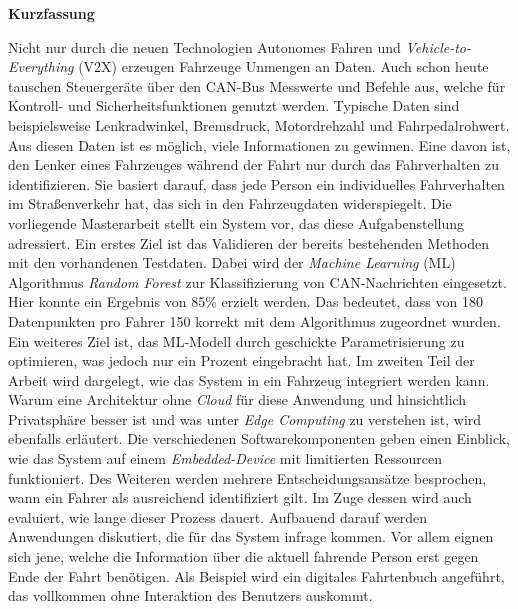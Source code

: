 %
%
%
%
%



\cleardoublepage

{\Large\bfseries Kurzfassung\\}

Nicht nur durch die neuen Technologien Autonomes Fahren und \textit{Vehicle-to-Everything} (V2X) erzeugen Fahrzeuge Unmengen an Daten. Auch schon heute tauschen Steuergeräte über den CAN-Bus Messwerte und Befehle aus, welche für Kontroll- und Sicherheitsfunktionen genutzt werden. Typische Daten sind beispielsweise Lenkradwinkel, Bremsdruck, Motordrehzahl und Fahrpedalrohwert. Aus diesen Daten ist es möglich, viele Informationen zu gewinnen. Eine davon ist, den Lenker eines Fahrzeuges während der Fahrt nur durch das Fahrverhalten zu identifizieren. Sie basiert darauf, dass jede Person ein individuelles Fahrverhalten im Straßenverkehr hat, das sich in den Fahrzeugdaten widerspiegelt. Die vorliegende Masterarbeit stellt ein System vor, das diese Aufgabenstellung adressiert. Ein erstes Ziel ist das Validieren der bereits bestehenden Methoden mit den vorhandenen Testdaten. Dabei wird der \textit{Machine Learning} (ML) Algorithmus \textit{Random Forest} zur Klassifizierung von CAN-Nachrichten eingesetzt. Hier konnte ein Ergebnis von 85\% erzielt werden. Das bedeutet, dass von 180 Datenpunkten pro Fahrer 150 korrekt mit dem Algorithmus zugeordnet wurden. Ein weiteres Ziel ist, das ML-Modell durch geschickte Parametrisierung zu optimieren, was jedoch nur ein Prozent eingebracht hat. Im zweiten Teil der Arbeit wird dargelegt, wie das System in ein Fahrzeug integriert werden kann. Warum eine Architektur ohne \textit{Cloud} für diese Anwendung und hinsichtlich Privatsphäre besser ist und was unter \textit{Edge Computing} zu verstehen ist, wird ebenfalls erläutert. Die verschiedenen Softwarekomponenten geben einen Einblick, wie das System auf einem \textit{Embedded-Device} mit limitierten Ressourcen funktioniert. Des Weiteren werden mehrere Entscheidungsansätze besprochen, wann ein Fahrer als ausreichend identifiziert gilt. Im Zuge dessen wird auch evaluiert, wie lange dieser Prozess dauert. Aufbauend darauf werden Anwendungen diskutiert, die für das System infrage kommen. Vor allem eignen sich jene, welche die Information über die aktuell fahrende Person erst gegen Ende der Fahrt benötigen. Als Beispiel wird ein digitales Fahrtenbuch angeführt, das vollkommen ohne Interaktion des Benutzers auskommt.

